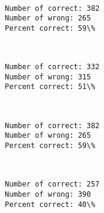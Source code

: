 \documentclass[11pt]{article}
\begin{document}
    \begin{center}
    \end{center}
    { \hspace*{\fill} \\}
    
    \begin{Verbatim}[commandchars=\\\{\}]
Number of correct: 382
Number of wrong: 265
Percent correct: 59\%

    \end{Verbatim}

    \begin{center}
    \end{center}
    { \hspace*{\fill} \\}
    
    \begin{Verbatim}[commandchars=\\\{\}]
Number of correct: 332
Number of wrong: 315
Percent correct: 51\%

    \end{Verbatim}

    \begin{center}
    \end{center}
    { \hspace*{\fill} \\}
    
    \begin{Verbatim}[commandchars=\\\{\}]
Number of correct: 382
Number of wrong: 265
Percent correct: 59\%

    \end{Verbatim}

    \begin{center}
    \end{center}
    { \hspace*{\fill} \\}
    
    \begin{Verbatim}[commandchars=\\\{\}]
Number of correct: 257
Number of wrong: 390
Percent correct: 40\%

    \end{Verbatim}
\end{document}
